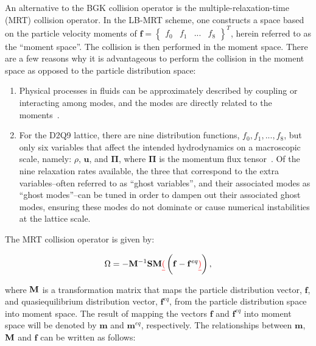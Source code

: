 An alternative to the BGK collision operator is the multiple-relaxation-time (MRT) collision operator.
In the LB-MRT scheme, one constructs a space based on the particle velocity \DIFdelbegin \DIFdel{, $\pvel$, }\DIFdelend moments of $\mathbf{f} = \begin{Bmatrix}f_0 & f_1 & ... & f_8\end{Bmatrix}^T$, herein referred to as the ``moment space''.
The collision is then performed in the moment space.
There are a few reasons why it is advantageous to perform the collision in the moment space as opposed to the particle distribution space:
 \begin{enumerate} 
    \item Physical processes in fluids can be approximately described by coupling or interacting among modes, and the modes are directly related to the moments~\cite{lallemand2000theory}.
    \item For the D2Q9 lattice, there are nine distribution functions, $f_0, f_1, ..., f_8$, but only six variables that affect the intended hydrodynamics on a macroscopic scale, namely: $\rho$, $\mathbf{u}$, and $\mathbf{\Pi}$, where $\mathbf{\Pi}$ is the momentum flux tensor~\cite{dellar2003incompressible}.
    Of the nine relaxation rates available, the three that correspond to the extra variables--often referred to as ``ghost variables'', and their associated modes as ``ghost modes''--can be tuned in order to dampen out their associated ghost modes, ensuring these modes do not dominate or cause numerical instabilities at the lattice scale.
 \end{enumerate} 

The MRT collision operator is given by:

\begin{equation} \label{eq:mrt-colop}
	\colop = - {\transM}^{-1} \relaxM \transM \DIFdelbegin \DIFdel{(}\DIFdelend \DIFaddbegin \left(\DIFaddend \mathbf{f} - \mathbf{f}^{eq}\DIFdelbegin \DIFdel{)}\DIFdelend \DIFaddbegin \right)\DIFaddend ,
\end{equation}

\noindent where $\mathbf{M}$ is a transformation matrix that maps the particle distribution vector, $\mathbf{f}$, and quasiequilibrium distribution vector, $\mathbf{f}^{eq}$, from the particle distribution space into moment space.
The result of mapping the vectors $\mathbf{f}$ and $\mathbf{f}^{eq}$ into moment space will be denoted by $\mathbf{m}$ and $\mathbf{m}^{eq}$, respectively.
The relationships between $\mathbf{m}$, $\mathbf{M}$ and $\mathbf{f}$ can be written as follows:


